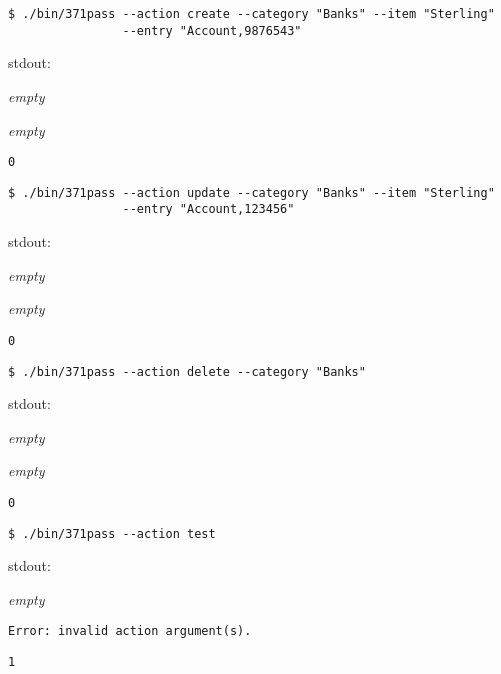 \documentclass[a4paper]{article}
\begin{document}
\begin{Verbatim}[formatcom=\bfseries]
$ ./bin/371pass --action create --category "Banks" --item "Sterling"
                --entry "Account,9876543"
\end{Verbatim}
\begin{labeling}{ stdout:}
    \item[stdout:]
    \emph{empty}
    
    \item[stderr:]
    \emph{empty}
    
    \item[exit:]
    \texttt{0}
\end{labeling}

\begin{Verbatim}[formatcom=\bfseries]
$ ./bin/371pass --action update --category "Banks" --item "Sterling"
                --entry "Account,123456"
\end{Verbatim}
\begin{labeling}{ stdout:}
    \item[stdout:]
    \emph{empty}
    
    \item[stderr:]
    \emph{empty}
    
    \item[exit:]
    \texttt{0}
\end{labeling}

\begin{Verbatim}[formatcom=\bfseries]
$ ./bin/371pass --action delete --category "Banks"
\end{Verbatim}
\begin{labeling}{ stdout:}
    \item[stdout:]
    \emph{empty}
    
    \item[stderr:]
    \emph{empty}
    
    \item[exit:]
    \texttt{0}
\end{labeling}

\begin{Verbatim}[formatcom=\bfseries]
$ ./bin/371pass --action test
\end{Verbatim}
\begin{labeling}{ stdout:}
    \item[stdout:]
    \emph{empty}
    
    \item[stderr:]
    \begin{lstlisting}[backgroundcolor = \color{lightgray},belowskip=0pt]
Error: invalid action argument(s).
    \end{lstlisting}
    
    \item[exit:]
    \texttt{1}
\end{labeling}
\end{document}
